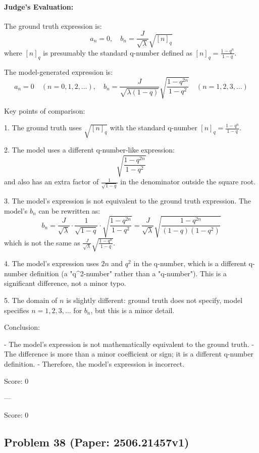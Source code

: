 \documentclass[10pt]{article}
\begin{document}
\paragraph*{Judge's Evaluation:}

The ground truth expression is:
\[
a_n = 0, \quad b_n = \frac{J}{\sqrt{\lambda}} \sqrt{[n]_q}
\]
where \([n]_q\) is presumably the standard q-number defined as \([n]_q = \frac{1 - q^n}{1 - q}\).

The model-generated expression is:
\[
a_n = 0 \quad (n=0,1,2,\dots), \quad
b_n = \frac{J}{\sqrt{\lambda (1-q)}} \sqrt{\frac{1 - q^{2n}}{1 - q^2}} \quad (n=1,2,3,\dots)
\]

Key points of comparison:

1. The ground truth uses \(\sqrt{[n]_q}\) with the standard q-number \([n]_q = \frac{1 - q^n}{1 - q}\).

2. The model uses a different q-number-like expression:
\[
\sqrt{\frac{1 - q^{2n}}{1 - q^2}}
\]
and also has an extra factor of \(\frac{1}{\sqrt{1-q}}\) in the denominator outside the square root.

3. The model's expression is not equivalent to the ground truth expression. The model's \(b_n\) can be rewritten as:
\[
b_n = \frac{J}{\sqrt{\lambda}} \cdot \frac{1}{\sqrt{1-q}} \cdot \sqrt{\frac{1 - q^{2n}}{1 - q^2}} = \frac{J}{\sqrt{\lambda}} \sqrt{\frac{1 - q^{2n}}{(1-q)(1 - q^2)}}
\]
which is not the same as \(\frac{J}{\sqrt{\lambda}} \sqrt{\frac{1 - q^n}{1 - q}}\).

4. The model's expression uses \(2n\) and \(q^2\) in the q-number, which is a different q-number definition (a "q^2-number" rather than a "q-number"). This is a significant difference, not a minor typo.

5. The domain of \(n\) is slightly different: ground truth does not specify, model specifies \(n=1,2,3,\dots\) for \(b_n\), but this is a minor detail.

Conclusion:

- The model's expression is not mathematically equivalent to the ground truth.
- The difference is more than a minor coefficient or sign; it is a different q-number definition.
- Therefore, the model's expression is incorrect.

Score: 0

---

Score: 0

\newpage
\subsection*{Problem 38 (Paper: 2506.21457v1)}
\end{document}
